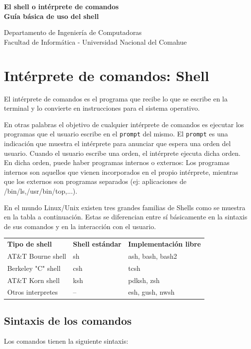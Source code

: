 \documentclass[12pt]{article}
\def\maketitle{

 \makeatletter
 {\color{bl} \centering \huge \sc \textbf{
 El shell o intérprete de comandos \\ 
\large \vspace*{-8pt} \color{black} Guía básica de uso del shell
 \vspace*{8pt} }\par}
 \makeatother


 \makeatletter
 {\centering \small 
 	Departamento de Ingeniería de Computadoras \\
 	Facultad de Informática - Universidad Nacional del Comahue \\
 	\vspace{20pt} }
 \makeatother

}
\begin{document}
\thispagestyle{empty}
\maketitle
\setlength{\parindent}{0pt}

\section{Intérprete de comandos: Shell}

El intérprete de comandos es el programa que recibe lo que se escribe en la terminal y lo convierte en instrucciones para el sistema operativo.

En otras palabras el objetivo de cualquier intérprete de comandos es ejecutar los programas que el usuario escribe en el \texttt{prompt} del mismo. 
El \texttt{prompt} es una indicación que muestra el intérprete para anunciar que espera una orden del usuario. Cuando el usuario escribe una orden, 
el intérprete ejecuta dicha orden. En dicha orden, puede haber programas internos o externos: Los programas internos son aquellos que vienen 
incorporados en el propio intérprete, mientras que los externos son programas separados (ej: aplicaciones de /bin/ls,/usr/bin/top,...).\cite{curlin}

En el mundo Linux/Unix existen tres grandes familias de Shells como se muestra en la tabla a continuación. Estas se diferencian entre 
sí básicamente en la sintaxis de sus comandos y en la interacción con el usuario.

\begin{center}
\begin{tabular}{lll}
\rowcolor{tcA}
\textbf{Tipo de shell} & \textbf{Shell estándar} & \textbf{Implementación libre}\\
AT\&T Bourne shell & sh & ash, bash, bash2\\
Berkeley "C" shell & csh & tcsh\\
AT\&T Korn shell & ksh & pdksh, zsh\\
Otros interpretes  & -- & esh, gush, nwsh
\end{tabular}
\end{center}

\subsection{Sintaxis de los comandos}

Los comandos tienen la siguiente sintaxis:
\end{document}
